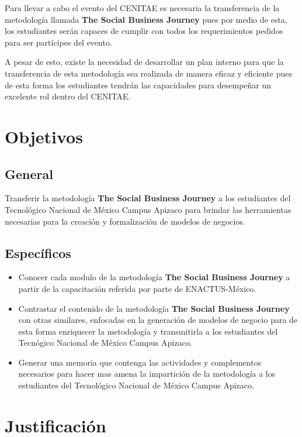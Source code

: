 \documentclass[11pt]{article}
\begin{document}
Para llevar a cabo el evento del CENITAE es necesaria la transferencia de la metodología llamada \textbf{The Social Business Journey} pues por medio de esta, los estudiantes serán capaces de cumplir con todos los requerimientos pedidos para ser partícipes del evento.

A pesar de esto, existe la necesidad de desarrollar un plan interno para que la transferencia de esta metodología sea realizada de manera eficaz y eficiente pues de esta forma los estudiantes tendrán las capacidades para desempeñar un excelente rol dentro del CENITAE.

\section{Objetivos}
\label{sec:org5a11dde}

\subsection{General}
\label{sec:orga80c7e0}

Transferir la metodología \textbf{The Social Business Journey} a los estudiantes del Tecnológico Nacional de México Campus Apizaco para brindar las herramientas necesarias para la creación y formalización de modelos de negocios.

\subsection{Específicos}
\label{sec:org07c3e5e}

\begin{itemize}
\item Conocer cada modulo de la metodología \textbf{The Social Business Journey} a partir de la capacitación referida por parte de ENACTUS-México.
\item Contrastar el contenido de la metodología \textbf{The Social Business Journey} con otras similares, enfocadas en la generación de modelos de negocio para de esta forma enriquecer la metodología y transmitirla a los estudiantes del Tecnógico Nacional de México Campus Apizaco.
\item Generar una memoria que contenga las actividades y complementos necesarios para hacer mas amena la impartición de la metodología a los estudiantes del Tecnológico Nacional de México Campus Apizaco.
\end{itemize}

\section{Justificación}
\label{sec:org2dfe519}
\end{document}

